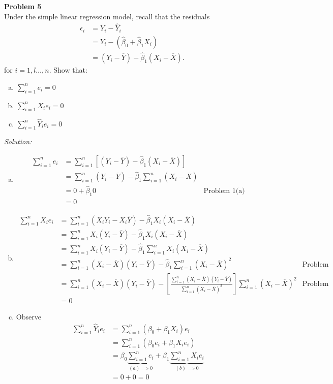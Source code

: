 \documentclass{article}
\newenvironment{problem}[2][Problem]
    { \begin{mdframed}[backgroundcolor=gray!20] \textbf{#1 #2} \\}
    {  \end{mdframed}}
\newenvironment{solution}
    {\textit{Solution:}}
    {}
\begin{document}
\begin{problem}{5}
Under the simple linear regression model, recall that the
residuals
\begin{align*}
\epsilon_i &= Y_i - \hat Y_i \\
&= Y_i - ( \hat \beta_0 + \hat \beta_1 X_i) \\ 
&= (Y_i - \overline Y ) - \hat \beta_1(X_i - \overline X).
\end{align*}
for $i = 1,l\dots, n.$ Show that:
\begin{enumerate}[(a)]
\item $\sum_{i  =1}^n e_i = 0$
\item $\sum_{i  =1}^n X_i e_i= 0$
\item $\sum_{i = 1}^n \hat Y_i e_i = 0$
\end{enumerate}
\end{problem}
\begin{solution}
\begin{enumerate}[(a)]
\item 
\begin{align*}
\sum_{i  =1}^n e_i &= \sum_{i  =1}^n [(Y_i - \overline Y ) - \hat \beta_1(X_i - \overline X)] \\
&=  \sum_{i  =1}^n (Y_i  -  \overline Y) - \hat \beta_1  \sum_{i  =1}^n (X_i - \overline{X})\\
&= 0 + \hat \beta_1 0 & \text{Problem 1(a)} \\
&= 0
\end{align*} 

\item

\begin{align*}
\sum_{i  =1}^n X_i e_i &= \sum_{i = 1}^n (X_i Y_i - X_i \overline Y ) - \hat \beta_1X_i(X_i  -  \overline X) \\
&=  \sum_{i = 1}^n X_i (Y_i - \overline Y ) - \hat \beta_1X_i(X_i  -  \overline X)  \\
&= \sum_{i = 1}^n X_i (Y_i - \overline Y ) - \hat \beta_1 \sum_{i = 1}^nX_i(X_i  -  \overline X)\\
&= \sum_{i = 1}^n (X_i - \overline{X}) (Y_i - \overline Y ) - \hat \beta_1 \sum_{i = 1}^n (X_i  -  \overline X)^2 & \text{Problem 2}\\
&= \sum_{i = 1}^n (X_i - \overline{X}) (Y_i - \overline Y ) - \left [ \frac{\sum_{i = 1}^n (X_i - \overline{X}) (Y_i - \overline{Y})}{ \sum_{i = 1}^n (X_i - \overline{X})^2} \right] \sum_{i = 1}^n (X_i  -  \overline X)^2  & \text{Problem 3(b)} \\
&= 0
\end{align*}
\item Observe
\begin{align*}
\sum_{i  =1}^n \hat Y_i e_i &= \sum_{i  =1}^n (\beta_0 + \beta_1 X_i) e_i \\
&= \sum_{i  =1}^n (\beta_0 e_i + \beta_1 X_i e_i)\\
&=\beta_0 \underbrace{\sum_{i  =1}^n  e_i}_{(a) \implies 0} + \beta_1 \underbrace{ \sum_{i  =1}^n X_i e_i }_{(b) \implies 0}  \\
&= 0 + 0 = 0
\end{align*}
\end{enumerate}
\end{solution}
\end{document}
